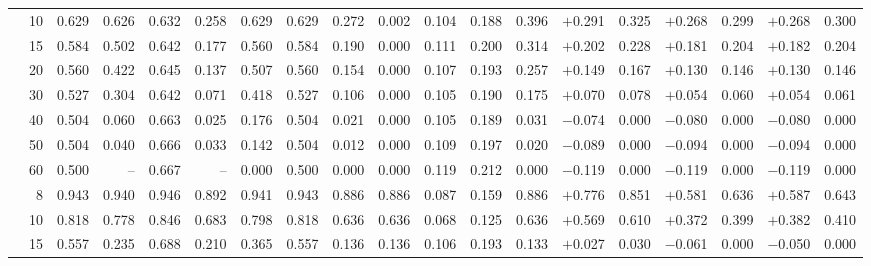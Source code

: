 \documentclass[conference]{IEEEtran}
\theoremstyle{remark}
\begin{document}
\begin{table}[ht]
{\begin{tabular}{p{1.55cm}r rrrr rr rr rr r rr rr rr}
  & 10 & 0.629 & 0.626 & 0.632 & 0.258 & 0.629 & 0.629 & 0.272 & 0.002 & 0.104 & 0.188 & 0.396 & $+$0.291 & 0.325 & $+$0.268 & 0.299 & $+$0.268 & 0.300 \\
  & 15 & 0.584 & 0.502 & 0.642 & 0.177 & 0.560 & 0.584 & 0.190 & 0.000 & 0.111 & 0.200 & 0.314 & $+$0.202 & 0.228 & $+$0.181 & 0.204 & $+$0.182 & 0.204 \\
  & 20 & 0.560 & 0.422 & 0.645 & 0.137 & 0.507 & 0.560 & 0.154 & 0.000 & 0.107 & 0.193 & 0.257 & $+$0.149 & 0.167 & $+$0.130 & 0.146 & $+$0.130 & 0.146 \\
  & 30 & 0.527 & 0.304 & 0.642 & 0.071 & 0.418 & 0.527 & 0.106 & 0.000 & 0.105 & 0.190 & 0.175 & $+$0.070 & 0.078 & $+$0.054 & 0.060 & $+$0.054 & 0.061 \\
  & 40 & 0.504 & 0.060 & 0.663 & 0.025 & 0.176 & 0.504 & 0.021 & 0.000 & 0.105 & 0.189 & 0.031 & $-$0.074 & 0.000 & $-$0.080 & 0.000 & $-$0.080 & 0.000 \\
  & 50 & 0.504 & 0.040 & 0.666 & 0.033 & 0.142 & 0.504 & 0.012 & 0.000 & 0.109 & 0.197 & 0.020 & $-$0.089 & 0.000 & $-$0.094 & 0.000 & $-$0.094 & 0.000 \\
  & 60 & 0.500 & -- & 0.667 & -- & 0.000 & 0.500 & 0.000 & 0.000 & 0.119 & 0.212 & 0.000 & $-$0.119 & 0.000 & $-$0.119 & 0.000 & $-$0.119 & 0.000 \\
\midrule
{}
  & 8 & 0.943 & 0.940 & 0.946 & 0.892 & 0.941 & 0.943 & 0.886 & 0.886 & 0.087 & 0.159 & 0.886 & $+$0.776 & 0.851 & $+$0.581 & 0.636 & $+$0.587 & 0.643 \\
  & 10 & 0.818 & 0.778 & 0.846 & 0.683 & 0.798 & 0.818 & 0.636 & 0.636 & 0.068 & 0.125 & 0.636 & $+$0.569 & 0.610 & $+$0.372 & 0.399 & $+$0.382 & 0.410 \\
  & 15 & 0.557 & 0.235 & 0.688 & 0.210 & 0.365 & 0.557 & 0.136 & 0.136 & 0.106 & 0.193 & 0.133 & $+$0.027 & 0.030 & $-$0.061 & 0.000 & $-$0.050 & 0.000 \\

\end{tabular}}
\end{table}
\end{document}
